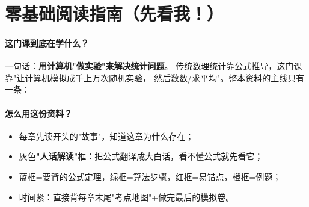 \section*{零基础阅读指南（先看我！）}

\paragraph{这门课到底在学什么？}一句话：\textbf{用计算机"做实验"来解决统计问题}。
传统数理统计靠公式推导，这门课靠"让计算机模拟成千上万次随机实验，
然后数数/求平均"。整本资料的主线只有一条：

\begin{center}
\end{center}

\paragraph{怎么用这份资料？}
\begin{itemize}[leftmargin=2em]
  \item 每章先读开头的"故事"，知道这章为什么存在；
  \item 灰色\textbf{"人话解读"}框：把公式翻译成大白话，看不懂公式就先看它；
  \item 蓝框=要背的公式定理，绿框=算法步骤，红框=易错点，橙框=例题；
  \item 时间紧：直接背每章末尾"考点地图"+做完最后的模拟卷。
\end{itemize}

